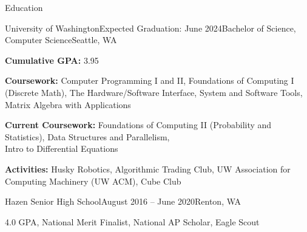 \documentclass{resume} %
\begin{document}
\vspace{-1.0em} %


\begin{rSection}{Education}

\begin{education}{University of Washington}{Expected Graduation: June 2024}{Bachelor of Science, Computer Science}{Seattle, WA}
\item {\bf Cumulative GPA:} 3.95
\item {\bf Coursework:} Computer Programming I and II, Foundations of Computing I (Discrete Math), The Hardware/Software Interface, System and Software Tools, Matrix Algebra with Applications
\item {\bf Current Coursework:} Foundations of Computing II (Probability and Statistics), Data Structures and Parallelism, \\ Intro to Differential Equations
\item {\bf Activities:} Husky Robotics, Algorithmic Trading Club, UW Association for Computing Machinery (UW ACM), Cube Club
\end{education}

\begin{education}{Hazen Senior High School}{August 2016 – June 2020}{}{Renton, WA}
\item 4.0 GPA, National Merit Finalist, National AP Scholar, Eagle Scout
\end{education}

\end{rSection}

\end{document}
